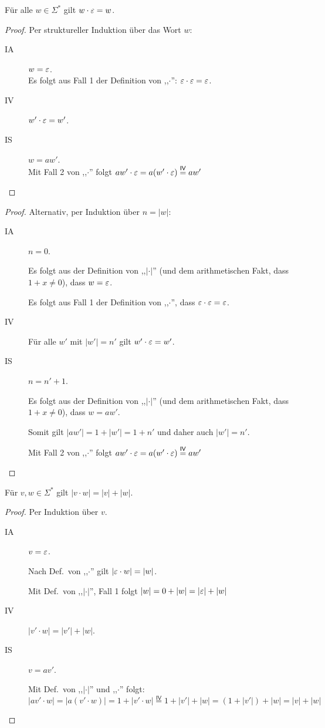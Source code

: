 \begin{lemma}
  Für alle $w \in \Sigma^*$ gilt $w \cdot \varepsilon = w$.
\end{lemma}
\begin{proof}
  Per struktureller Induktion über das Wort $w$:
  \begin{description}
  \item[IA] $w = \varepsilon$. \\
      Es folgt aus Fall 1 der Definition von ,,$\cdot$'': $\varepsilon \cdot \varepsilon = \varepsilon$.
  \item[IV] $w' \cdot \varepsilon = w'$.
  \item[IS] $w = aw'$.
    \\
    Mit Fall 2 von ,,$\cdot$'' folgt $aw' \cdot \varepsilon = a (w' \cdot \varepsilon) \stackrel{\mathsf{IV}}{=} aw'$
  \end{description}
\end{proof}
\begin{proof}
  Alternativ, per Induktion über $n = |w|$:
  \begin{description}
  \item[IA] $n = 0$.

    Es folgt aus der Definition von ,,$|\cdot|$'' (und dem arithmetischen Fakt, dass $1 + x \not = 0$), dass $w = \varepsilon$.

    Es folgt aus Fall 1 der Definition von ,,$\cdot$'', dass $\varepsilon \cdot \varepsilon = \varepsilon$.
  \item[IV] Für alle $w'$ mit $|w'| = n'$ gilt $w' \cdot \varepsilon = w'$.
  \item[IS] $n = n' + 1$.

    Es folgt aus der Definition von ,,$|\cdot|$'' (und dem arithmetischen Fakt, dass $1 + x \not = 0$), dass $w = aw'$.

    Somit gilt $|aw'| = 1 + |w'| = 1 + n'$ und daher auch $|w'| = n'$.

    Mit Fall 2 von ,,$\cdot$'' folgt $aw' \cdot \varepsilon = a (w' \cdot \varepsilon) \stackrel{\mathsf{IV}}{=} aw'$
  \end{description}
\end{proof}
\begin{lemma}
  Für $v,w \in \Sigma^*$ gilt $|v\cdot w| = |v| + |w|$.
\end{lemma}
\begin{proof}
  Per Induktion über $v$.
  \begin{description}
  \item[IA] $v = \varepsilon$.

    Nach Def.\ von ,,$\cdot$'' gilt $|\varepsilon \cdot w| = |w|$.

    Mit Def.\ von ,,$|\cdot|$'', Fall 1 folgt $|w| = 0 + |w| = |\varepsilon| + |w|$
 \item[IV] $|v' \cdot w| = |v'| + |w|$.
 \item[IS] $v = av'$.

   Mit Def.\ von ,,$|\cdot|$'' und ,,$\cdot$'' folgt:
   \begin{displaymath}
   |av'\cdot w| = |a(v'\cdot w)| = 1 + |v' \cdot w| \stackrel{\mathsf{IV}}{=} 1 + |v'| + |w| = (1 + |v'|) + |w| = |v| + |w|
   \end{displaymath}
  
  \end{description}
\end{proof}

